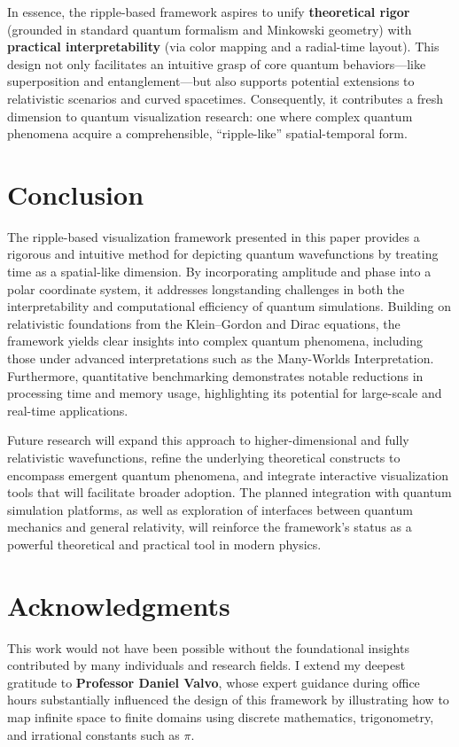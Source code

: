 \documentclass{article}
\begin{document}
In essence, the ripple-based framework aspires to unify \textbf{theoretical rigor} (grounded in standard quantum formalism and Minkowski geometry) with \textbf{practical interpretability} (via color mapping and a radial-time layout). This design not only facilitates an intuitive grasp of core quantum behaviors—like superposition and entanglement—but also supports potential extensions to relativistic scenarios and curved spacetimes. Consequently, it contributes a fresh dimension to quantum visualization research: one where complex quantum phenomena acquire a comprehensible, “ripple-like” spatial-temporal form.

\section{Conclusion}
\label{sec:conclusion}

The ripple-based visualization framework presented in this paper provides a rigorous and intuitive method for depicting quantum wavefunctions by treating time as a spatial-like dimension. By incorporating amplitude and phase into a polar coordinate system, it addresses longstanding challenges in both the interpretability and computational efficiency of quantum simulations. Building on relativistic foundations from the Klein--Gordon and Dirac equations, the framework yields clear insights into complex quantum phenomena, including those under advanced interpretations such as the Many-Worlds Interpretation. Furthermore, quantitative benchmarking demonstrates notable reductions in processing time and memory usage, highlighting its potential for large-scale and real-time applications.

Future research will expand this approach to higher-dimensional and fully relativistic wavefunctions, refine the underlying theoretical constructs to encompass emergent quantum phenomena, and integrate interactive visualization tools that will facilitate broader adoption. The planned integration with quantum simulation platforms, as well as exploration of interfaces between quantum mechanics and general relativity, will reinforce the framework's status as a powerful theoretical and practical tool in modern physics.

\newpage

\section*{Acknowledgments}

This work would not have been possible without the foundational insights contributed by many individuals and research fields. I extend my deepest gratitude to \textbf{Professor Daniel Valvo}, whose expert guidance during office hours substantially influenced the design of this framework by illustrating how to map infinite space to finite domains using discrete mathematics, trigonometry, and irrational constants such as \(\pi\). 
\end{document}
